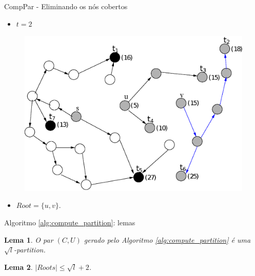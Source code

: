 \documentclass[10pt]{beamer}
\newtheorem{lema}{Lema}
\begin{document}
\begin{frame}{CompPar - Eliminando os nós cobertos}
\begin{itemize}
  \item $t = 2$
\end{itemize}
\begin{figure}[H]
\centering
\includegraphics[scale=0.45]{imagens/compPar_cov2}
\label{fig:fig}
\end{figure}
\begin{itemize}
  \item $Root = \{u, v\}$.
\end{itemize}
\end{frame}

\begin{frame}{Algoritmo \ref{alg:compute_partition}: lemas}
\begin{lema} 
\label{lem:proc_comppar}
\cite{Elkin2006} O par $(C, U)$ gerado pelo Algoritmo \ref{alg:compute_partition} é uma $\sqrt l$-\emph{partition}.
\end{lema}

\begin{lema} 
\label{lem:roots_cardinality}
\cite{Elkin2006} $|Roots| \le \sqrt{l} + 2$.
\end{lema}

\end{frame}
\end{document}
